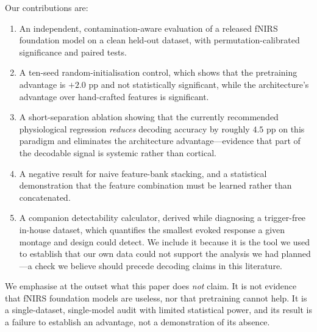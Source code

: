 Our contributions are:
\begin{enumerate}
  \item An independent, contamination-aware evaluation of a released fNIRS foundation model on a
        clean held-out dataset, with permutation-calibrated significance and paired tests.
  \item A ten-seed random-initialisation control, which shows that the pretraining advantage is
        $+2.0$ pp and not statistically significant, while the architecture's advantage over
        hand-crafted features is significant.
  \item A short-separation ablation showing that the currently recommended physiological
        regression \emph{reduces} decoding accuracy by roughly $4.5$ pp on this paradigm and
        eliminates the architecture advantage---evidence that part of the decodable signal is
        systemic rather than cortical.
  \item A negative result for naive feature-bank stacking, and a statistical demonstration that
        the feature combination must be learned rather than concatenated.
  \item A companion detectability calculator, derived while diagnosing a trigger-free in-house
        dataset, which quantifies the smallest evoked response a given montage and design could
        detect. We include it because it is the tool we used to establish that our own data
        could not support the analysis we had planned---a check we believe should precede
        decoding claims in this literature.
\end{enumerate}

We emphasise at the outset what this paper does \emph{not} claim. It is not evidence that
fNIRS foundation models are useless, nor that pretraining cannot help. It is a single-dataset,
single-model audit with limited statistical power, and its result is a failure to establish an
advantage, not a demonstration of its absence.
